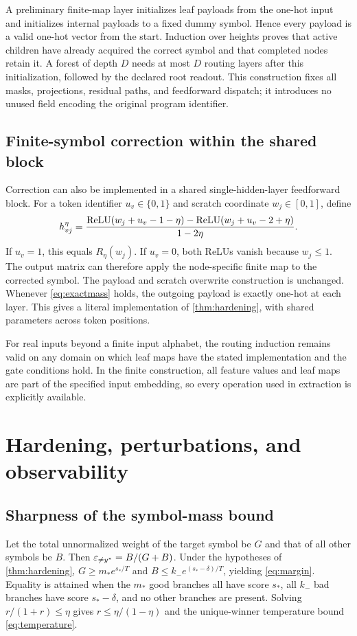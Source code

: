 A preliminary finite-map layer initializes leaf payloads from the one-hot input and initializes internal payloads to a fixed dummy symbol. Hence every payload is a valid one-hot vector from the start. Induction over heights proves that active children have already acquired the correct symbol and that completed nodes retain it. A forest of depth $D$ needs at most $D$ routing layers after this initialization, followed by the declared root readout. This construction fixes all masks, projections, residual paths, and feedforward dispatch; it introduces no unused field encoding the original program identifier.

\subsection{Finite-symbol correction within the shared block}
Correction can also be implemented in a shared single-hidden-layer feedforward block. For a token identifier $u_v\in\{0,1\}$ and scratch coordinate $w_j\in[0,1]$, define
\begin{equation}
 h_{vj}^{\eta}=
 \frac{\operatorname{ReLU}(w_j+u_v-1-\eta)-\operatorname{ReLU}(w_j+u_v-2+\eta)}{1-2\eta}.
 \label{eq:gatedround}
\end{equation}
If $u_v=1$, this equals $R_\eta(w_j)$. If $u_v=0$, both ReLUs vanish because $w_j\le1$. The output matrix can therefore apply the node-specific finite map to the corrected symbol. The payload and scratch overwrite construction is unchanged. Whenever \eqref{eq:exactmass} holds, the outgoing payload is exactly one-hot at each layer. This gives a literal implementation of \cref{thm:hardening}, with shared parameters across token positions.

For real inputs beyond a finite input alphabet, the routing induction remains valid on any domain on which leaf maps have the stated implementation and the gate conditions hold. In the finite construction, all feature values and leaf maps are part of the specified input embedding, so every operation used in extraction is explicitly available.

\section{Hardening, perturbations, and observability}\label{app:hardening}
\subsection{Sharpness of the symbol-mass bound}
Let the total unnormalized weight of the target symbol be $G$ and that of all other symbols be $B$. Then $\varepsilon_{\ne y^*}=B/(G+B)$. Under the hypotheses of \cref{thm:hardening}, $G\ge m_*e^{s_*/T}$ and $B\le k_-e^{(s_*-\delta)/T}$, yielding \eqref{eq:margin}. Equality is attained when the $m_*$ good branches all have score $s_*$, all $k_-$ bad branches have score $s_*-\delta$, and no other branches are present. Solving $r/(1+r)\le\eta$ gives $r\le\eta/(1-\eta)$ and the unique-winner temperature bound \eqref{eq:temperature}.

